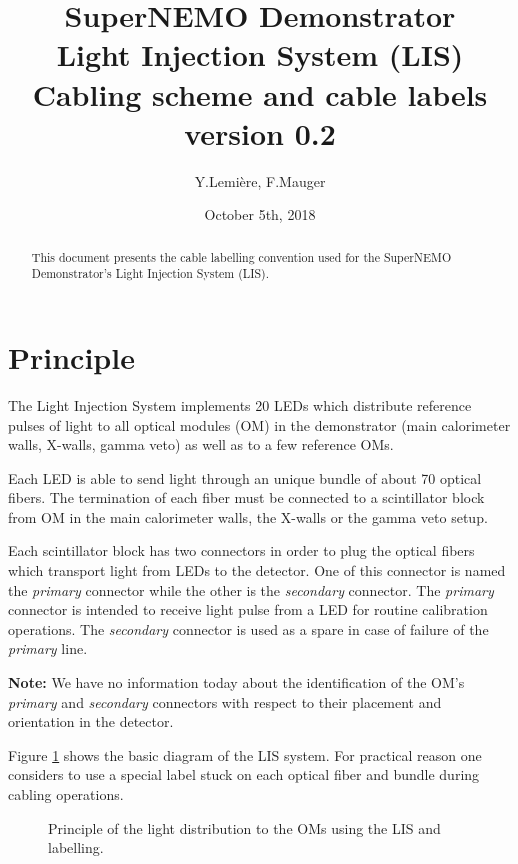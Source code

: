 \documentclass[12pt,a4paper]{article}
\title{SuperNEMO Demonstrator\\
  Light Injection System (LIS)\\
  Cabling scheme and cable labels\\
  version 0.2}
\author{Y.Lemi\`ere, F.Mauger}
\date{October 5th, 2018}
\newcommand{\pdftextimgpath}{./pdftex_t}
\begin{document}
\maketitle

\begin{abstract}
  \noindent This document presents the cable labelling convention used
  for the SuperNEMO Demonstrator's Light Injection System (LIS).
\end{abstract}

\tableofcontents

\section{Principle}

The  Light  Injection  System  implements  20  LEDs  which  distribute
reference  pulses  of  light  to  all  optical  modules  (OM)  in  the
demonstrator (main calorimeter walls, X-walls,  gamma veto) as well as
to a few reference OMs.

Each LED is  able to send light  through an unique bundle  of about 70
optical fibers.  The termination of each  fiber must be connected to a
scintillator block from OM in  the main calorimeter walls, the X-walls
or the gamma veto setup.

Each  scintillator block  has  two  connectors in  order  to plug  the
optical fibers which  transport light from LEDs to  the detector.  One
of  this connector  is named  the \emph{primary}  connector while  the
other is the \emph{secondary} connector.  The \emph{primary} connector
is intended to receive light pulse  from a LED for routine calibration
operations. The \emph{secondary} connector is  used as a spare in case
of failure of the \emph{primary} line.

\vskip 10pt
\noindent\textbf{Note:}  We  have  no   information  today  about  the
identification  of   the  OM's  \emph{primary}   and  \emph{secondary}
connectors  with respect  to their  placement and  orientation in  the
detector.
\vskip 10pt

\noindent
Figure \ref{fig:lis:principle:1}  shows the  basic diagram of  the LIS
system.  For  practical reason  one considers to  use a  special label
stuck on each optical fiber and bundle during cabling operations.

\begin{figure}[h!]
  \begin{center}
    \scalebox{0.75}{}
  \end{center}
  \caption{Principle of  the light distribution  to the OMs  using the
    LIS and labelling.}
  \label{fig:lis:principle:1}
\end{figure}
\end{document}
